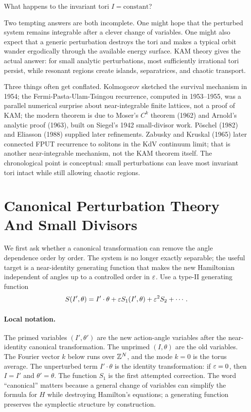 What happens to the invariant tori \(I=\text{constant}\)?

Two tempting answers are both incomplete. One might hope that the perturbed
system remains integrable after a clever change of variables. One might also
expect that a generic perturbation destroys the tori and makes a typical orbit
wander ergodically through the available energy surface. KAM theory gives the
actual answer: for small analytic perturbations, most sufficiently irrational
tori persist, while resonant regions create islands, separatrices, and chaotic
transport.

Three things often get conflated. Kolmogorov sketched the survival mechanism in
1954; the Fermi-Pasta-Ulam-Tsingou recurrence, computed in 1953--1955, was a
parallel numerical surprise about near-integrable finite lattices, not a proof
of KAM; the modern theorem is due to Moser's \(C^k\) theorem (1962) and
Arnold's analytic proof (1963), built on Siegel's 1942 small-divisor work.
P\"oschel (1982) and Eliasson (1988) supplied later refinements. Zabusky and
Kruskal (1965) later connected FPUT recurrence to solitons in the KdV continuum
limit; that is another near-integrable mechanism, not the KAM theorem itself.
The chronological point is conceptual: small perturbations can leave most
invariant tori intact while still allowing chaotic regions.

\section{Canonical Perturbation Theory And Small Divisors}
\label{sec:canonical-perturbation-small-divisors}

We first ask whether a canonical transformation can remove the angle dependence
order by order. The system is no longer exactly separable; the useful target is
a near-identity generating function that makes the new Hamiltonian independent
of angles up to a controlled order in \(\varepsilon\). Use a
type-II generating function
\[
  S(I',\theta)=I'\cdot\theta+\varepsilon S_1(I',\theta)+\varepsilon^2S_2+\cdots.
\]

\paragraph{Local notation.}
The primed variables \((I',\theta')\) are the new action-angle variables after
the near-identity canonical transformation.  The unprimed \((I,\theta)\) are
the old variables.  The Fourier vector \(k\) below runs over \(\mathbb{Z}^N\), and the
mode \(k=0\) is the torus average.  The unperturbed term
\(I'\cdot\theta\) is the identity transformation: if \(\varepsilon=0\), then
\(I=I'\) and \(\theta'=\theta\).  The function \(S_1\) is the first attempted
correction.  The word ``canonical'' matters because a general change of
variables can simplify the formula for \(H\) while destroying Hamilton's
equations; a generating function preserves the symplectic structure by
construction.

